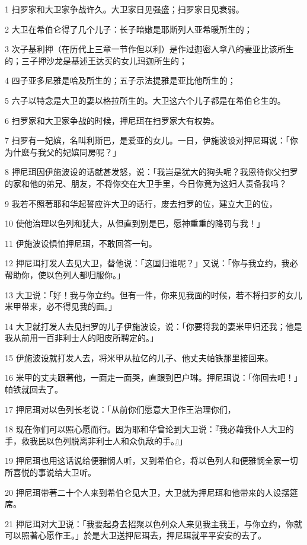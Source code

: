 \par 1 扫罗家和大卫家争战许久。大卫家日见强盛；扫罗家日见衰弱。
\par 2 大卫在希伯仑得了几个儿子：长子暗嫩是耶斯列人亚希暖所生的；
\par 3 次子基利押（在历代上三章一节作但以利）是作过迦密人拿八的妻亚比该所生的；三子押沙龙是基述王达买的女儿玛迦所生的；
\par 4 四子亚多尼雅是哈及所生的；五子示法提雅是亚比他所生的；
\par 5 六子以特念是大卫的妻以格拉所生的。大卫这六个儿子都是在希伯仑生的。
\par 6 扫罗家和大卫家争战的时候，押尼珥在扫罗家大有权势。
\par 7 扫罗有一妃嫔，名叫利斯巴，是爱亚的女儿。一日，伊施波设对押尼珥说：「你为什麽与我父的妃嫔同房呢？」
\par 8 押尼珥因伊施波设的话就甚发怒，说：「我岂是犹大的狗头呢？我恩待你父扫罗的家和他的弟兄、朋友，不将你交在大卫手里，今日你竟为这妇人责备我吗？
\par 9 我若不照著耶和华起誓应许大卫的话行，废去扫罗的位，建立大卫的位，
\par 10 使他治理以色列和犹大，从但直到别是巴，愿神重重的降罚与我！」
\par 11 伊施波设惧怕押尼珥，不敢回答一句。
\par 12 押尼珥打发人去见大卫，替他说：「这国归谁呢？」又说：「你与我立约，我必帮助你，使以色列人都归服你。」
\par 13 大卫说：「好！我与你立约。但有一件，你来见我面的时候，若不将扫罗的女儿米甲带来，必不得见我的面。」
\par 14 大卫就打发人去见扫罗的儿子伊施波设，说：「你要将我的妻米甲归还我；他是我从前用一百非利士人的阳皮所聘定的。」
\par 15 伊施波设就打发人去，将米甲从拉亿的儿子、他丈夫帕铁那里接回来。
\par 16 米甲的丈夫跟著他，一面走一面哭，直跟到巴户琳。押尼珥说：「你回去吧！」帕铁就回去了。
\par 17 押尼珥对以色列长老说：「从前你们愿意大卫作王治理你们，
\par 18 现在你们可以照心愿而行。因为耶和华曾论到大卫说：『我必藉我仆人大卫的手，救我民以色列脱离非利士人和众仇敌的手。』」
\par 19 押尼珥也用这话说给便雅悯人听，又到希伯仑，将以色列人和便雅悯全家一切所喜悦的事说给大卫听。
\par 20 押尼珥带著二十个人来到希伯仑见大卫，大卫就为押尼珥和他带来的人设摆筵席。
\par 21 押尼珥对大卫说：「我要起身去招聚以色列众人来见我主我王，与你立约，你就可以照著心愿作王。」於是大卫送押尼珥去，押尼珥就平平安安的去了。
